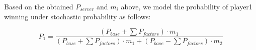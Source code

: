 

    
  



Based on the obtained $P_{server}$ and $m_i$ above, we model the probability of player1 winning under stochastic probability as follows:

\begin{equation}P_{1} = \frac{\left( P_{base} + \sum P_{factors} \right)\cdot m_{1}}{\left( P_{base} +\sum P_{factors}  \right) \cdot  m_{1} +\left( P_{base} -\sum P_{factors} \right) \cdot m_{2} } 
\end{equation}


